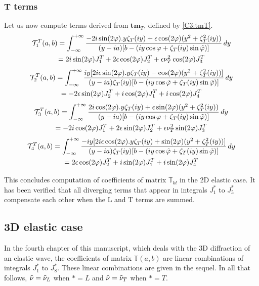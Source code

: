\subsubsection{T terms}
Let us now compute terms derived from $\mathbf{tm}_T$, defined by \eqref{C3:tmT}.
\begin{multline}
\hfill\mathcal{T}_1^T(a,b)=\int_{-\infty}^{+\infty} \frac{-2i\sin(2\varphi).y\zeta_T(iy)+\epsilon \cos (2\varphi)(y^2+\zeta_T^2(iy))}{(y-ia)\lbrack b-(iy\cos \varphi+ \zeta_T(iy)\sin\phiti) \rbrack} \, dy\hfill\\
\hfill=2i\sin(2\varphi)J_1^T+2\epsilon\cos(2\varphi)J_2^T+\epsilon\nu_T^2\cos(2\varphi)J_3^T\hfill
\end{multline}
\begin{multline}
\hfill\mathcal{T}_2^T(a,b)=\int_{-\infty}^{+\infty} \frac{iy\lbrack 2i\epsilon \sin(2\varphi).y\zeta_T(iy)- \cos (2\varphi)(y^2+\zeta_T^2(iy))\rbrack}{(y-ia)\zeta_T(iy)\lbrack b-(iy\cos \tilde{\varphi}+ \zeta_T(iy)\sin \tilde{\varphi}) \rbrack} \, dy \hfill\\
\hfill=-2\epsilon\sin(2\varphi)J_2^T+i\cos(2\varphi)J_1^T+i\cos(2\varphi)J_4^T\hfill
\end{multline}
\begin{multline}
\hfill\mathcal{T}_3^T(a,b)=\int_{-\infty}^{+\infty} \frac{2i\cos(2\varphi).y\zeta_T(iy)+\epsilon \sin (2\varphi)(y^2+\zeta_T^2(iy))}{(y-ia)\lbrack b-(iy\cos \varphi+ \zeta_T(iy)\sin\phiti) \rbrack} \, dy \hfill\\
\hfill=-2i\cos(2\varphi)J_1^T+2\epsilon\sin(2\varphi)J_2^T+\epsilon\nu_T^2\sin(2\varphi)J_3^T\hfill
\end{multline}
\begin{multline}
\hfill\mathcal{T}_4^T(a,b)=\int_{-\infty}^{+\infty} \frac{-iy\lbrack 2i\epsilon \cos(2\varphi).y\zeta_T(iy)+\sin (2\varphi)(y^2+\zeta_T^2(iy))\rbrack}{(y-ia)\zeta_T(iy)\lbrack b-(iy\cos\tilde{ \varphi}+ \zeta_T(iy)\sin \tilde{\varphi}) \rbrack} \, dy \hfill\\
\hfill=2\epsilon\cos(2\varphi)J_2^T+i\sin(2\varphi)J_1^T+i\sin(2\varphi)J_4^T \hfill
\end{multline}

This concludes computation of coefficients of matrix $\mathbb{T}_{kl}$ in the 2D elastic case. It has been verified that all diverging terms that appear in integrals $J_1^*$ to $J_5^*$ compensate each other when the L and T terms are summed.


\subsection{3D elastic case}
\label{finalT3D}
In the fourth chapter of this manuscript, which deals with the 3D diffraction of an elastic wave, the coefficients of matrix $\mathbb{T}(a,b)$ are linear combinations of integrals $J_1^*$ to $J_8^*$. These linear combinations are given in the sequel. In all that follows, $\tilde{\nu}=\tilde{\nu}_L$ when $*=L$ and $\tilde{\nu}=\tilde{\nu}_T$ when $*=T$.
